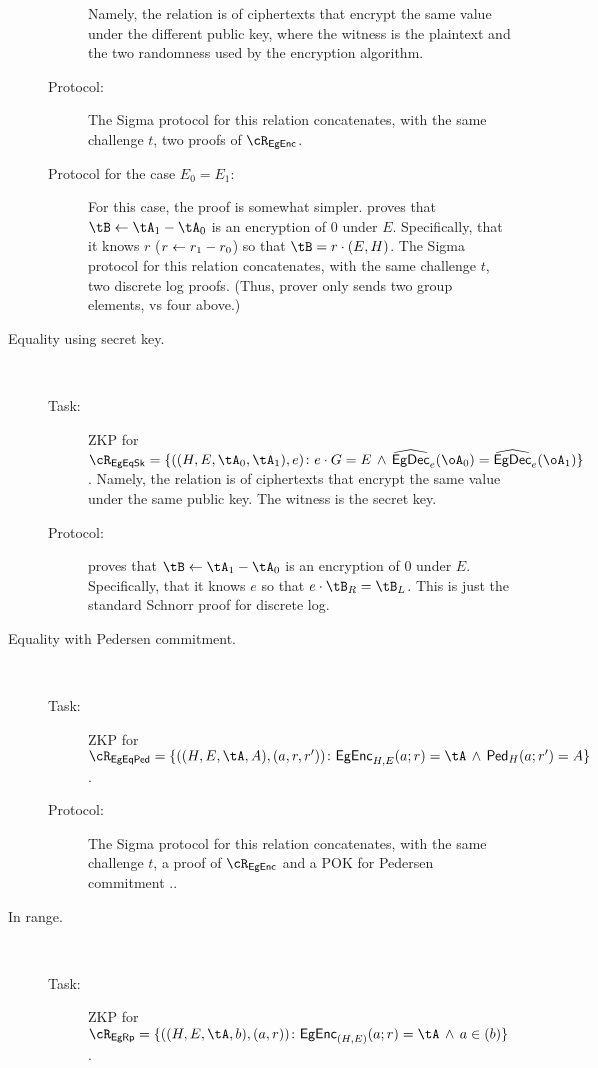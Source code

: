 \begin{description}
\begin{description}
		
		Namely, the relation  is of  ciphertexts that encrypt the  same value under the different  public key, where the witness  is the plaintext and the two randomness used by the encryption algorithm.
		
		\item[Protocol:] The Sigma protocol for this relation concatenates, with the same challenge $t$, two proofs of $\rEgEnc$. 

\item[Protocol for the case $E_0=E_1$:] For this case, the proof is somewhat simpler. \Pc proves that $\tB \asn \tA_1 - \tA_0$ is an encryption of $0$ under $E$. Specifically, that it knows $r$ (\ie $r\leftarrow r_1 -r_0$) so that  $\tB  = r\cdot (E,H)$. The Sigma protocol for this relation concatenates, with the same challenge $t$, two discrete log proofs. (Thus, prover only sends two group elements, vs four above.)        		
\end{description}


\item[Equality using secret key.]~




\begin{description}
	\item[Task:] ZKP for  $\rEgEqSk =\rEgEqSkDef$. Namely, the relation  is of  ciphertexts that encrypt the  same value under the same public key. The witness is the secret key.
	
	\item[Protocol:] \Pc proves that $\tB \asn \tA_1 - \tA_0$ is an encryption of $0$ under $E$. Specifically, that it knows $e$ so that  $e\cdot \tB_R  = \tB_L$. This is just the standard Schnorr proof for discrete log.
	
\end{description}


\item[Equality with Pedersen commitment.]~

\begin{description}
	\item[Task:] ZKP for  $\rEgEqPed =\rEgEqPedDef$.
	
	\item[Protocol:]  The Sigma protocol for this relation concatenates, with the same challenge $t$, a  proof of $\rEgEnc$ and a POK for  Pedersen  commitment  \cite[Protocol A.1]{HaitnerLNR23}..  
\end{description}	


	\item[In range.] ~
	\begin{description}
		\item[Task:] ZKP for $\rEgRp =\rEgRpDef$.
		

\end{description}
\end{description}

